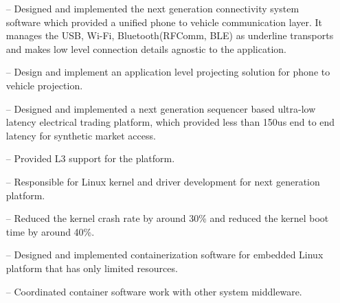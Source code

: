 \documentclass[10pt,a4paper,roman]{moderncv}        %
\begin{document}
\begin{itemize}
  \item[--]{Designed and implemented the next generation connectivity system
    software which provided a unified phone to vehicle communication layer.
    It manages the USB, Wi-Fi, Bluetooth(RFComm, BLE) as underline transports
    and makes low level connection details agnostic to the application.}
  \item[--]{Design and implement an application level projecting solution for phone to vehicle projection.}
\end{itemize}

\begin{itemize}
  \item[--]{Designed and implemented a next generation sequencer based ultra-low
    latency electrical trading platform, which provided less than 150us end to end latency for synthetic market access.}
  \item[--]{Provided L3 support for the platform.}
\end{itemize}

\begin{itemize}
  \item[--]{Responsible for Linux kernel and driver development for next
    generation platform. }
  \item[--]{Reduced the kernel crash rate by around 30\% and reduced the kernel boot time by around 40\%.}
  \item[--]{Designed and implemented containerization software for embedded Linux
    platform that has only limited resources.}
  \item[--]{Coordinated container software work with other system middleware.}
\end{itemize}
\end{document}

